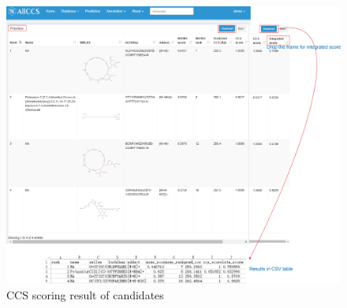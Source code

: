 \documentclass[12pt,]{book}
\theoremstyle{definition}
\theoremstyle{definition}
\theoremstyle{definition}
\theoremstyle{remark}
\begin{document}
\begin{figure}

{\centering \includegraphics{images/chapter4/figure4.6candidate_rank_scoring} 

}

\caption{CCS scoring result of candidates}\label{fig:figure4d6}
\end{figure}


\end{document}
